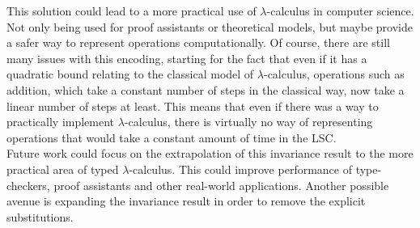 \documentclass[11pt]{article}
\begin{document}
This solution could lead to a more practical use of $\lambda$-calculus in computer science. Not only being used for proof assistants or theoretical models, but maybe provide a safer way to represent operations computationally. Of course, there are still many issues with this encoding, starting for the fact that even if it has a quadratic bound relating to the classical model of $\lambda$-calculus, operations such as addition, which take a constant number of steps in the classical way, now take a linear number of steps at least. This means that even if there was a way to practically implement $\lambda$-calculus, there is virtually no way of representing operations that would take a constant amount of time in the LSC.\\

Future work could focus on the extrapolation of this invariance result to the more practical area of typed $\lambda$-calculus. This could improve performance of type-checkers, proof assistants and other real-world applications. Another possible avenue is expanding the invariance result in order to remove the explicit substitutions.

\printbibliography{}
\end{document}
